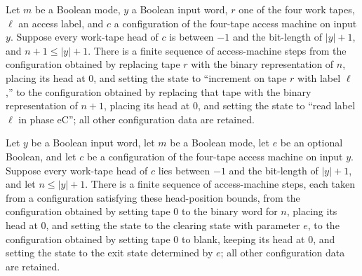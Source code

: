 \begin{lemma}
\label{Complexity.LogProg.access_inc}
\leanok
{}
Let $m$ be a Boolean mode, $y$ a Boolean input word, $r$ one of the four work tapes,
$\ell$ an access label, and $c$ a configuration of the four-tape access machine on input
$y$. Suppose every work-tape head of $c$ is between $-1$ and the bit-length of $|y|+1$,
and $n+1\le |y|+1$. There is a finite sequence of access-machine steps from the
configuration obtained by replacing tape $r$ with the binary representation of $n$,
placing its head at $0$, and setting the state to “increment on tape $r$ with label
$\ell$,” to the configuration obtained by replacing that tape with the binary
representation of $n+1$, placing its head at $0$, and setting the state to “read label
$\ell$ in phase eC”; all other configuration data are retained.
\end{lemma}

\begin{lemma}
\label{Complexity.LogProg.access_clear}
\leanok
{}
Let $y$ be a Boolean input word, let $m$ be a Boolean mode, let $e$ be an optional
Boolean, and let $c$ be a configuration of the four-tape access machine on input $y$.
Suppose every work-tape head of $c$ lies between $-1$ and the bit-length of $|y|+1$, and
let $n\le |y|+1$. There is a finite sequence of access-machine steps, each taken from a
configuration satisfying these head-position bounds, from the configuration obtained by
setting tape $0$ to the binary word for $n$, placing its head at $0$, and setting the
state to the clearing state with parameter $e$, to the configuration obtained by setting
tape $0$ to blank, keeping its head at $0$, and setting the state to the exit state
determined by $e$; all other configuration data are retained.
\end{lemma}

